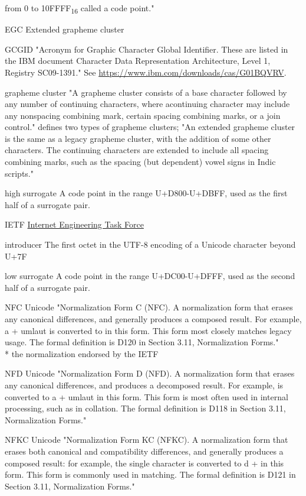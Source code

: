 \documentclass[b4paper]{article}
\begin{document}
\begin{definition}
from 0 to 10FFFF\textsubscript{16} called a code point."
\item [EGC] Extended grapheme cluster
\item [GCGID] "Acronym for Graphic Character Global Identifier.
These are listed in the IBM document
Character Data Representation Architecture, Level 1, Registry SC09-1391."
See \url{https://www.ibm.com/downloads/cas/G01BQVRV}.
\item [grapheme cluster]
"A grapheme cluster consists of a base character followed by any
number of continuing characters, where acontinuing character may
include any nonspacing combining mark, certain spacing combining
marks, or a join control."
{\cite{UAX29}} defines two types of grapheme clusters;
"An extended grapheme cluster is the same as a legacy grapheme cluster,
with the addition of some other characters.
The continuing characters are extended to include all spacing combining marks,
such as the spacing (but dependent) vowel signs in Indic scripts."
\item [high surrogate] A code point in the range U+D800-U+DBFF, used
as the first half of a surrogate pair.
\item [IETF] \href{https://ietf.org}{Internet Engineering Task Force}
\item [introducer] The first octet in the UTF-8 encoding of a Unicode character beyond U+7F
\item [low surrogate] A code point in the range U+DC00-U+DFFF, used
as the second half of a surrogate pair.
\item [NFC]  Unicode
"Normalization Form C (NFC). A normalization form that erases any
canonical differences, and generally produces a composed result. For
example, a + umlaut is converted to  in this form. This form most
closely matches legacy usage. The formal definition is D120 in Section
3.11, Normalization Forms."
\\*
the normalization endorsed by the IETF
\item [NFD] Unicode
"Normalization Form D (NFD). A normalization form that erases any
canonical differences, and produces a decomposed result. For example,
 is converted to a + umlaut in this form. This form is most often
used in internal processing, such as in collation. The formal
definition is D118 in Section 3.11, Normalization Forms."

\item [NFKC] Unicode
"Normalization Form KC (NFKC). A normalization form that erases both
canonical and compatibility differences, and generally produces a
composed result: for example, the single  character is converted to d
+  in this form. This form is commonly used in matching. The formal
definition is D121 in Section 3.11, Normalization Forms."


\end{definition}
\end{document}
